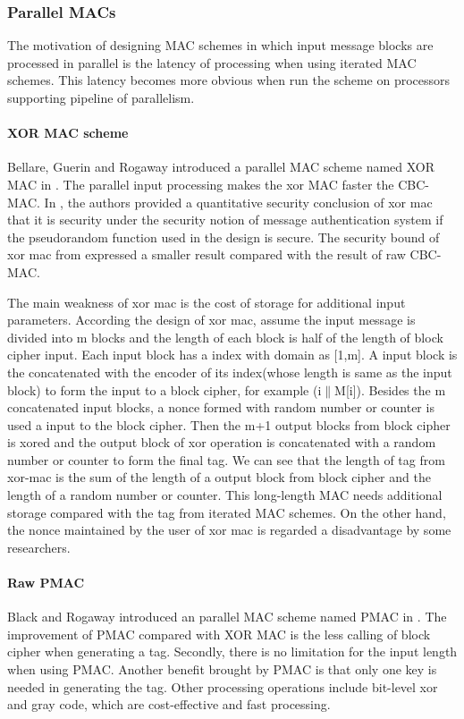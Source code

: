 \documentclass{article}
\begin{document}
\subsubsection{Parallel MACs}
The motivation of designing MAC schemes in which input message blocks are processed in parallel is the latency of processing when using iterated MAC schemes. This latency becomes more obvious when run the scheme on processors supporting pipeline of parallelism. 
\paragraph{XOR MAC scheme}
Bellare, Guerin and Rogaway introduced a parallel MAC scheme named XOR MAC in \cite{xor-mac}. 
The parallel input processing makes the xor MAC faster the CBC-MAC. 
In \cite{xor-mac}, the authors provided a quantitative security conclusion of xor mac that it is security under the security notion of message authentication system if the pseudorandom function used in the design is secure. The security bound of xor mac from \cite{xor-mac} expressed a smaller result compared with the result of raw CBC-MAC. 

The main weakness of xor mac is the cost of storage for additional input parameters. According the design of xor mac, assume the input message is divided into m blocks and the length of each block is half of the length of block cipher input. Each input block has a index with domain as [1,m]. A input block is the concatenated with the encoder of its index(whose length is same as the input block) to form the input to a block cipher, for example (i$\|$M[i]). Besides the m concatenated input blocks, a nonce formed with random number or counter is used a input to the block cipher. Then the m+1 output blocks from block cipher is xored and the output block of xor operation is concatenated with a random number or counter to form the final tag. 
We can see that the length of tag from xor-mac is the sum of the length of a output block from block cipher and the length of a random number or counter. This long-length MAC needs additional storage compared with the tag from iterated MAC schemes. 
On the other hand, the nonce maintained by the user of xor mac is regarded a disadvantage by some researchers.

\paragraph{Raw PMAC}
Black and Rogaway introduced an parallel MAC scheme named PMAC in \cite{pmac}. 
The improvement of PMAC compared with XOR MAC is the less calling of block cipher when generating a tag. Secondly, there is no limitation for the input length when using PMAC. 
Another benefit brought by PMAC is that only one key is needed in generating the tag. Other processing operations include bit-level xor and gray code, which are cost-effective and fast processing. 
\end{document}
